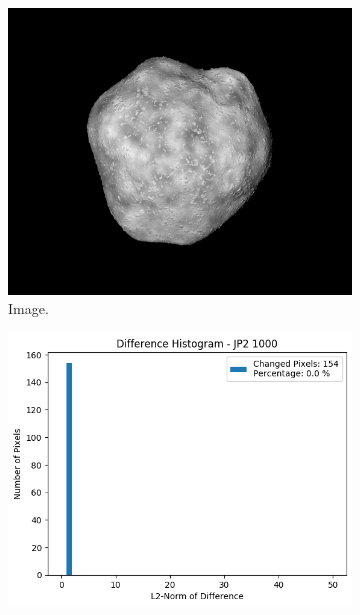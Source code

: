 \begin{figure}[htb]
    \centering
    \begin{subfigure}[b]{0.48\textwidth}
        \centering
        \includegraphics[width=\textwidth]{doc/thesis/0_figures/compare_quality/set1/jp2_1000.png}
        \caption{Image.}
        \label{fig:img_quality_comp_jp2_1000_orig}
    \end{subfigure}
    \begin{subfigure}[b]{0.48\textwidth}
        \centering
        \includegraphics[width=\textwidth]{doc/thesis/0_figures/compare_quality/set1/jp2_1000_diff_histogram.png}

\end{subfigure}
\end{figure}
